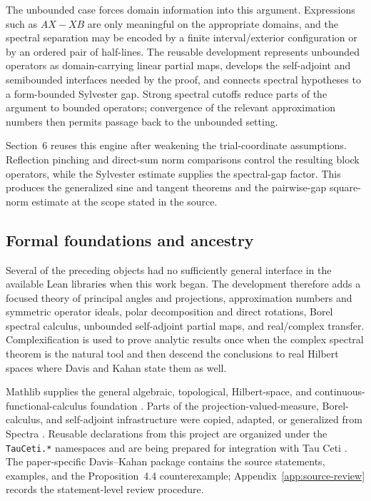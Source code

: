 \documentclass[11pt]{article}
\begin{document}
The unbounded case forces domain information into this argument.  Expressions
such as $AX-XB$ are only meaningful on the appropriate domains, and the
spectral separation may be encoded by a finite interval/exterior configuration
or by an ordered pair of half-lines.  The reusable development represents
unbounded operators as domain-carrying linear partial maps, develops the
self-adjoint and semibounded interfaces needed by the proof, and connects
spectral hypotheses to a form-bounded Sylvester gap.  Strong spectral cutoffs
reduce parts of the argument to bounded operators; convergence of the relevant
approximation numbers then permits passage back to the unbounded setting.

Section~6 reuses this engine after weakening the trial-coordinate assumptions.
Reflection pinching and direct-sum norm comparisons control the resulting block
operators, while the Sylvester estimate supplies the spectral-gap factor.  This
produces the generalized sine and tangent theorems and the pairwise-gap
square-norm estimate at the scope stated in the source.

\subsection{Formal foundations and ancestry}

Several of the preceding objects had no sufficiently general interface in the
available Lean libraries when this work began.  The development therefore adds
a focused theory of principal angles and projections, approximation numbers and
symmetric operator ideals, polar decomposition and direct rotations, Borel
spectral calculus, unbounded self-adjoint partial maps, and real/complex
transfer.  Complexification is used to prove analytic results once when the
complex spectral theorem is the natural tool and then descend the conclusions
to real Hilbert spaces where Davis and Kahan state them as well.

Mathlib supplies the general algebraic, topological, Hilbert-space, and
continuous-functional-calculus foundation \citep{mathlib2020,dedecker2025cfc}.
Parts of the projection-valued-measure, Borel-calculus, and self-adjoint
infrastructure were copied, adapted, or generalized from Spectra
\citep{bornemann2026spectra}.  Reusable declarations from this project are
organized under the \texttt{TauCeti.*} namespaces and are being prepared for
integration with Tau Ceti \citep{tauceti2026}.  The paper-specific
Davis--Kahan package contains the source statements, examples, and the
Proposition~4.4 counterexample; Appendix~\ref{app:source-review} records the
statement-level review procedure.
\end{document}
